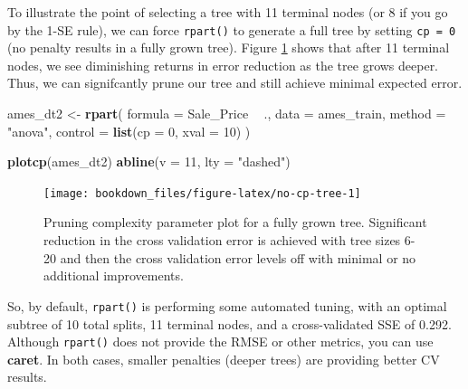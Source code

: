 \documentclass[]{krantz}
\makeatletter
\newenvironment{Shaded}{\begin{snugshade}}{\end{snugshade}}
\newcommand{\DataTypeTok}[1]{\textcolor[rgb]{0.27,0.27,0.27}{#1}}
\newcommand{\DecValTok}[1]{\textcolor[rgb]{0.06,0.06,0.06}{#1}}
\newcommand{\KeywordTok}[1]{\textcolor[rgb]{0.27,0.27,0.27}{\textbf{#1}}}
\newcommand{\NormalTok}[1]{#1}
\newcommand{\OperatorTok}[1]{\textcolor[rgb]{0.43,0.43,0.43}{\textbf{#1}}}
\newcommand{\StringTok}[1]{\textcolor[rgb]{0.5,0.5,0.5}{#1}}
\newenvironment{kframe}{%
\medskip{}
\setlength{\fboxsep}{.8em}
 \def\at@end@of@kframe{}%
 \ifinner\ifhmode%
  \def\at@end@of@kframe{\end{minipage}}%
  \begin{minipage}{\columnwidth}%
 \fi\fi%
 \def\FrameCommand##1{\hskip\@totalleftmargin \hskip-\fboxsep
 \colorbox{shadecolor}{##1}\hskip-\fboxsep
     \hskip-\linewidth \hskip-\@totalleftmargin \hskip\columnwidth}%
 \MakeFramed {\advance\hsize-\width
   \@totalleftmargin\z@ \linewidth\hsize
   \@setminipage}}%
 {\par\unskip\endMakeFramed%
 \at@end@of@kframe}
\renewenvironment{Shaded}{\begin{kframe}}{\end{kframe}}
\makeatother
\begin{document}
To illustrate the point of selecting a tree with 11 terminal nodes (or 8 if you go by the 1-SE rule), we can force \texttt{rpart()} to generate a full tree by setting \texttt{cp\ =\ 0} (no penalty results in a fully grown tree). Figure \ref{fig:no-cp-tree} shows that after 11 terminal nodes, we see diminishing returns in error reduction as the tree grows deeper. Thus, we can signifcantly prune our tree and still achieve minimal expected error.

\begin{Shaded}
\begin{Highlighting}[]
\NormalTok{ames_dt2 <-}\StringTok{ }\KeywordTok{rpart}\NormalTok{(}
    \DataTypeTok{formula =}\NormalTok{ Sale_Price }\OperatorTok{~}\StringTok{ }\NormalTok{.,}
    \DataTypeTok{data    =}\NormalTok{ ames_train,}
    \DataTypeTok{method  =} \StringTok{"anova"}\NormalTok{, }
    \DataTypeTok{control =} \KeywordTok{list}\NormalTok{(}\DataTypeTok{cp =} \DecValTok{0}\NormalTok{, }\DataTypeTok{xval =} \DecValTok{10}\NormalTok{)}
\NormalTok{)}

\KeywordTok{plotcp}\NormalTok{(ames_dt2)}
\KeywordTok{abline}\NormalTok{(}\DataTypeTok{v =} \DecValTok{11}\NormalTok{, }\DataTypeTok{lty =} \StringTok{"dashed"}\NormalTok{)}
\end{Highlighting}
\end{Shaded}

\begin{figure}

{\centering \texttt{[image: bookdown\_files/figure-latex/no-cp-tree-1]} 

}

\caption{Pruning complexity parameter plot for a fully grown tree. Significant reduction in the cross validation error is achieved with tree sizes 6-20 and then the cross validation error levels off with minimal or no additional improvements.}\label{fig:no-cp-tree}
\end{figure}

So, by default, \texttt{rpart()} is performing some automated tuning, with an optimal subtree of 10 total splits, 11 terminal nodes, and a cross-validated SSE of 0.292. Although \texttt{rpart()} does not provide the RMSE or other metrics, you can use \textbf{caret}. In both cases, smaller penalties (deeper trees) are providing better CV results.
\end{document}

